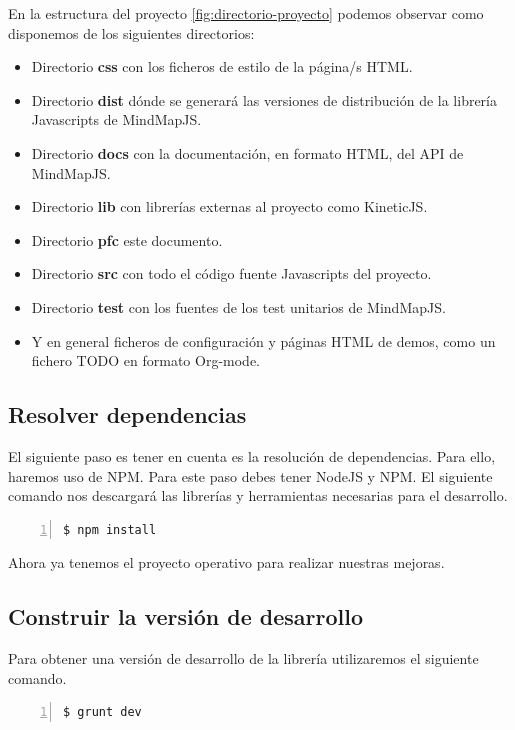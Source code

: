 En la estructura del proyecto \ref{fig:directorio-proyecto} podemos observar como disponemos de los siguientes directorios:
\begin{itemize}
\item Directorio \textbf{css} con los ficheros de estilo de la página/s HTML.
\item Directorio \textbf{dist} dónde se generará las versiones de distribución de la librería Javascripts de MindMapJS.
\item Directorio \textbf{docs} con la documentación, en formato HTML, del API de MindMapJS. 
\item Directorio \textbf{lib} con librerías externas al proyecto como KineticJS.
\item Directorio \textbf{pfc} este documento.
\item Directorio \textbf{src} con todo el código fuente Javascripts del proyecto.
\item Directorio \textbf{test} con los fuentes de los test unitarios de MindMapJS.
\item Y en general ficheros de configuración y páginas HTML de demos, como un fichero TODO en formato Org-mode.
\end{itemize}


\subsection{Resolver dependencias}

El siguiente paso es tener en cuenta es la resolución de dependencias. Para ello, haremos uso de NPM. Para este paso debes tener NodeJS y NPM. El siguiente comando nos descargará las librerías y herramientas necesarias para el desarrollo.

\begin{lstlisting}[language=bash, numbers=left]
$ npm install
\end{lstlisting}

Ahora ya tenemos el proyecto operativo para realizar nuestras mejoras.

\subsection{Construir la versión de desarrollo}
Para obtener una versión de desarrollo de la librería utilizaremos el siguiente comando.

\begin{lstlisting}[language=bash, numbers=left]
$ grunt dev
\end{lstlisting}

